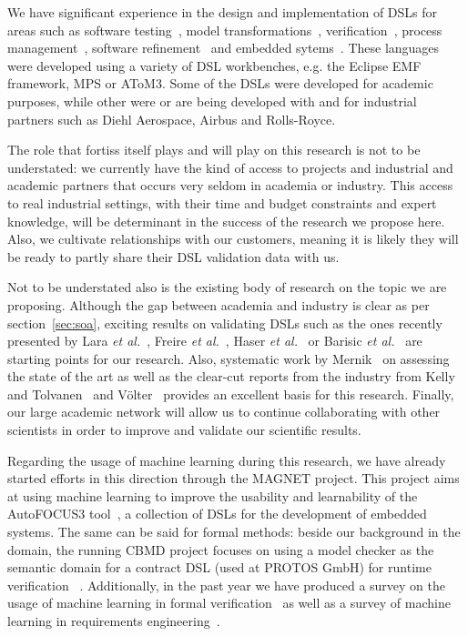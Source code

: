 \documentclass{scrartcl}
\begin{document}
We have significant experience in the design and implementation of DSLs for
areas such as software testing~\cite{lucio08}, model
transformations~\cite{BarrocaLAFS10}, verification~\cite{OakesTLW15,kanav18},
process management~\cite{LucioARAKH17}, software refinement~\cite{Syriani19} and
embedded sytems~\cite{Lucio18}.
These languages were developed using a variety of DSL workbenches, e.g. the
Eclipse EMF framework, MPS or AToM3. Some of the DSLs were developed for
academic purposes, while other were or are being developed with and for
industrial partners such as Diehl Aerospace, Airbus and Rolls-Royce.
 
The role that fortiss itself plays and will play on this research is not to be
understated: we currently have the kind of access to projects and industrial and
academic partners that occurs very seldom in academia or industry. This access
to real industrial settings, with their time and budget constraints and expert
knowledge, will be determinant in the success of the research we propose here.
Also, we cultivate relationships with our customers, meaning it is likely they
will be ready to partly share their DSL validation data with us.

Not to be understated also is the existing body of research on the topic we are
proposing. Although the gap between academia and industry is clear
as per section~\ref{sec:soa}, exciting results on validating DSLs such as the
ones recently presented by Lara \emph{et al.}~\cite{LaraGuerra13}, Freire \emph{et al.}~\cite{Freire14}, Haser
\emph{et al.}~\cite{Haser16} or Barisic \emph{et al.}~\cite{Barisic:12} are
starting points for our research. Also, systematic work by
Mernik~\cite{MernikHS05, Kosar2012, Mernik17} on assessing the state of the art
as well as the clear-cut reports from the industry from Kelly and
Tolvanen~\cite{Tolvanen016, Kelly2009, KellyTolvanen09, Kelly:2013,
TolvanenKelly2016, Tolvanen018} and V\"olter~\cite{Voelter09} provides an
excellent basis for this research. Finally, our large academic network will
allow us to continue collaborating with other scientists in order to improve and
validate our scientific results.

Regarding the usage of machine learning during this research, we have already
started efforts in this direction through the MAGNET project. This project aims
at using machine learning to improve the usability and learnability of the
AutoFOCUS3 tool~\cite{af3}, a collection of DSLs for the development of embedded
systems. The same can be said for formal methods: beside our background in the
domain, the running CBMD project focuses on using a model checker as the
semantic domain for a contract DSL (used at PROTOS GmbH) for runtime
verification~\cite{kanav18} .
Additionally, in the past year we have produced a survey on the usage of machine
learning in formal verification~\cite{Amrani18} as well as a survey of machine
learning in requirements engineering~\cite{Iqbal18}.
\end{document}
